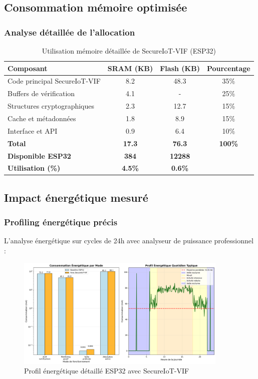 \subsection{Consommation mémoire optimisée}

\subsubsection{Analyse détaillée de l'allocation}

\begin{table}[h]
\centering
\caption{Utilisation mémoire détaillée de SecureIoT-VIF (ESP32)}
\label{tab:memory-detailed-esp32}
\begin{tabular}{|l|c|c|c|}
\hline
\textbf{Composant} & \textbf{SRAM (KB)} & \textbf{Flash (KB)} & \textbf{Pourcentage} \\
\hline
Code principal SecureIoT-VIF & 8.2 & 48.3 & 35\% \\
Buffers de vérification & 4.1 & - & 25\% \\
Structures cryptographiques & 2.3 & 12.7 & 15\% \\
Cache et métadonnées & 1.8 & 8.9 & 15\% \\
Interface et API & 0.9 & 6.4 & 10\% \\
\hline
\textbf{Total} & \textbf{17.3} & \textbf{76.3} & \textbf{100\%} \\
\hline
\textbf{Disponible ESP32} & \textbf{384} & \textbf{12288} & \\
\textbf{Utilisation (\%)} & \textbf{4.5\%} & \textbf{0.6\%} & \\
\hline
\end{tabular}
\end{table}

\subsection{Impact énergétique mesuré}

\subsubsection{Profiling énergétique précis}

L'analyse énergétique sur cycles de 24h avec analyseur de puissance professionnel :

\begin{figure}[h]
    \centering
    \includegraphics[width=0.9\textwidth]{assets/figures/energy_profile_esp32.png}
    \caption{Profil énergétique détaillé ESP32 avec SecureIoT-VIF}
    \label{fig:energy-profile-esp32}
\end{figure}

